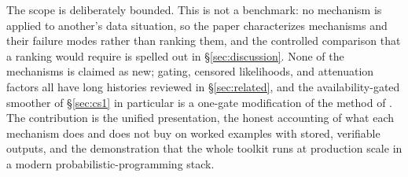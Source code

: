 The scope is deliberately bounded. This is not a benchmark: no mechanism is applied to another's data situation, so the paper characterizes mechanisms and their failure modes rather than ranking them, and the controlled comparison that a ranking would require is spelled out in \S\ref{sec:discussion}. None of the mechanisms is claimed as new; gating, censored likelihoods, and attenuation factors all have long histories reviewed in \S\ref{sec:related}, and the availability-gated smoother of \S\ref{sec:cs1} in particular is a one-gate modification of the method of \citet{teunter2011intermittent}. The contribution is the unified presentation, the honest accounting of what each mechanism does and does not buy on worked examples with stored, verifiable outputs, and the demonstration that the whole toolkit runs at production scale in a modern probabilistic-programming stack.
